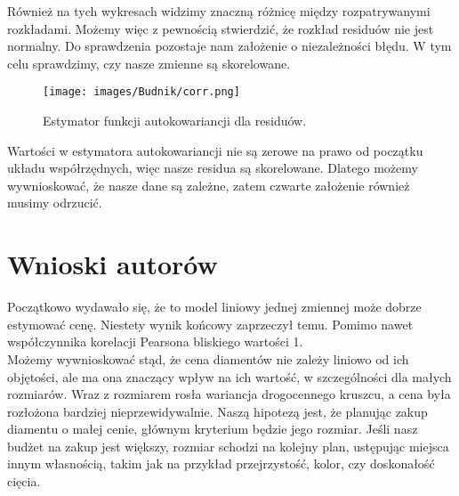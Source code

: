 \documentclass[12pt]{article}
\theoremstyle{exer}
\begin{document}
	Również na tych wykresach widzimy znaczną różnicę między rozpatrywanymi rozkładami. Możemy więc z pewnością stwierdzić, że rozkład residuów nie jest normalny. Do sprawdzenia pozostaje nam założenie o niezależności błędu. W tym celu sprawdzimy, czy nasze zmienne są skorelowane.
	\begin{figure}[H]
		\centering
		\texttt{[image: images/Budnik/corr.png]}
		\caption{Estymator funkcji autokowariancji dla residuów.}
	\end{figure}
	Wartości w estymatora autokowariancji nie są zerowe na prawo od początku układu współrzędnych, więc nasze residua są skorelowane. Dlatego możemy wywnioskować, że nasze dane są zależne, zatem czwarte założenie również musimy odrzucić.
	
	\section{Wnioski autorów}
	Początkowo wydawało się, że to model liniowy jednej zmiennej może dobrze estymować cenę. Niestety wynik końcowy zaprzeczył temu. Pomimo nawet współczynnika korelacji Pearsona bliskiego wartości 1.\\
	Możemy wywnioskować stąd, że cena diamentów nie zależy liniowo od ich objętości, ale ma ona znaczący wpływ na ich wartość, w szczególności dla małych rozmiarów. Wraz z rozmiarem rosła wariancja drogocennego kruszcu, a cena była rozłożona bardziej nieprzewidywalnie. Naszą hipotezą jest, że planując zakup diamentu o małej cenie, głównym kryterium będzie jego rozmiar. Jeśli nasz budżet na zakup jest większy, rozmiar schodzi na kolejny plan, ustępując miejsca innym własnością, takim jak na przykład przejrzystość, kolor, czy doskonałość cięcia.
	
\end{document}
